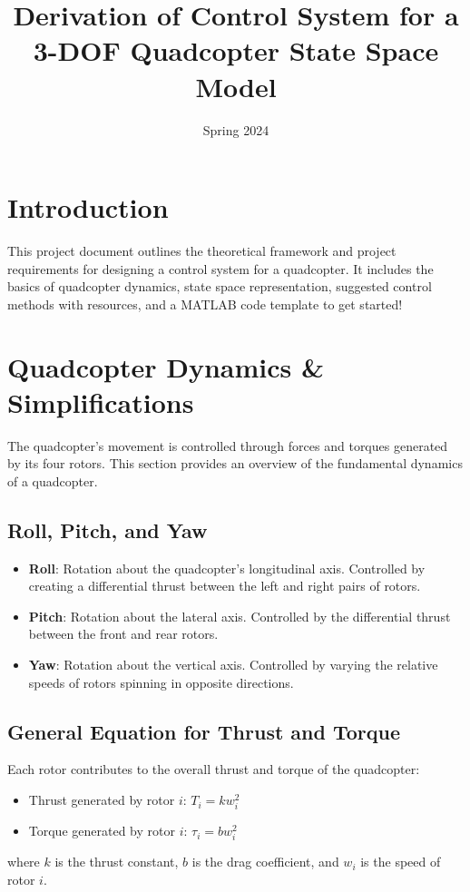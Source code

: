 \documentclass[12pt]{article}
\title{Derivation of Control System for a 3-DOF Quadcopter State Space Model}
\date{Spring 2024}
\begin{document}
\maketitle
\section{Introduction}
This project document outlines the theoretical framework and project requirements for designing a control system for a quadcopter. It includes the basics of quadcopter dynamics, state space representation, suggested control methods with resources, and a MATLAB code template to get started!

\section{Quadcopter Dynamics \& Simplifications}
The quadcopter's movement is controlled through forces and torques generated by its four rotors. This section provides an overview of the fundamental dynamics of a quadcopter.

\subsection{Roll, Pitch, and Yaw}
\begin{itemize}
    \item \textbf{Roll}: Rotation about the quadcopter's longitudinal axis. Controlled by creating a differential thrust between the left and right pairs of rotors.
    \item \textbf{Pitch}: Rotation about the lateral axis. Controlled by the differential thrust between the front and rear rotors.
    \item \textbf{Yaw}: Rotation about the vertical axis. Controlled by varying the relative speeds of rotors spinning in opposite directions.
\end{itemize}

\subsection{General Equation for Thrust and Torque}
Each rotor contributes to the overall thrust and torque of the quadcopter:
\begin{itemize}
    \item Thrust generated by rotor $i$: $T_i = k w_i^2$
    \item Torque generated by rotor $i$: $\tau_i = b w_i^2$
\end{itemize}
where $k$ is the thrust constant, $b$ is the drag coefficient, and $w_i$ is the speed of rotor $i$.
\end{document}
